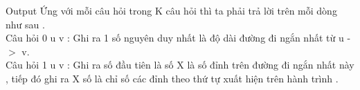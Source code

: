 Output
Ứng với mỗi câu hỏi trong K câu hỏi thì ta phải trả lời trên mỗi dòng như sau .   
\\   Câu hỏi 0 u v : Ghi ra 1 số nguyên duy nhất là độ dài đường đi ngắn nhất từ u -$>$ v.   
\\   Câu hỏi 1 u v : Ghi ra số đầu tiên là số X là số đỉnh trên đường đi ngắn nhất này , tiếp đó ghi ra X số là chỉ số các đỉnh theo thứ tự xuất hiện trên hành trình .   
\\